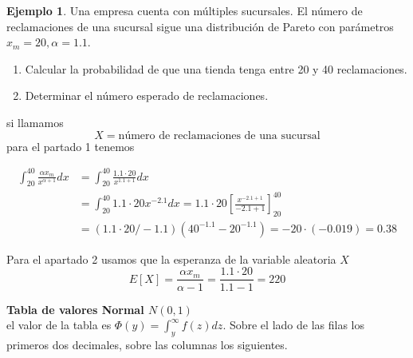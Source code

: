 \documentclass[]{book}
\theoremstyle{plain}
\theoremstyle{definition}
\newtheorem{example}[theorem]{Ejemplo}
\theoremstyle{definition} %
\begin{document}
\begin{example}
  Una empresa cuenta con múltiples sucursales. El número de reclamaciones de una sucursal sigue una distribución de Pareto 
  con parámetros $x_m = 20, \alpha = 1.1$. 
  \begin{enumerate}
    \item Calcular la probabilidad de que una tienda tenga entre 20 y 40 reclamaciones.
    \item Determinar el número esperado de reclamaciones.
  \end{enumerate}

  si llamamos 
  \[X=\text{número de reclamaciones de una sucursal}\] 
  para el partado 1 tenemos 

  \begin{align*}
    \int^{40}_{20} \frac{\alpha x_m}{x^{\alpha+1}}dx &=\int^{40}_{20} \frac{1.1\cdot 20}{x^{1.1 +1}}dx\\
    &=\int^{40}_{20} 1.1\cdot 20 x^{-2.1}dx = 1.1\cdot 20[\frac{x^{-2.1 + 1}}{-2.1 + 1}]^{40}_{20}\\
    &= (1.1\cdot 20 /-1.1) (40^{-1.1} - 20^{-1.1}) =  -20 \cdot (-0.019) = 0.38
  \end{align*}

  Para el apartado 2 usamos que la esperanza de la variable aleatoria $X$ 
  \[E[X] = \frac {\alpha x_m}{\alpha -1} = \frac{1.1 \cdot 20}{1.1 -1} = 220\]

\end{example}


\newpage
\newpage


\textbf{Tabla de valores Normal \(N(0,1)\)}\\
el valor de la tabla es \(\Phi(y) = \int^{\infty}_{y} f(z)dz\). Sobre el
lado de las filas los primeros dos decimales, sobre las columnas los
siguientes.
\end{document}
